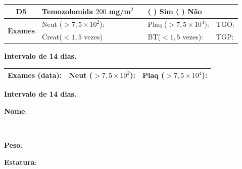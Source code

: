 \documentclass[11pt,a4paper,oldfontcommands]{memoir}
\def\entrywithlabel[#1]#2{\parbox{#1}{{\small #2:} \hrulefill}}
\begin{document}
\begin{center}
\begin{table}[H]
\begin{tabular}{p{1cm}p{5cm}|p{1cm}|p{4.5cm}|p{2cm}}
    \multicolumn{1}{c|}{\multirow{1}{*}{\textbf{D5}}}&{Temozolomida \(200\) mg/m\(^2\)}&&{(  ) Sim (  ) Não}&\\
    \hline
    \multicolumn{1}{c|}{\multirow{2}{*}{\textbf{Exames}}}&\multicolumn{2}{l|}{Neut (\(>7,5\times10^2\)):}&{Plaq (\(>7,5\times10^4\)):}&{TGO:}\\
    \cline{2-5}
    \multicolumn{1}{c|}{\multirow{2}{*}{{}}}&\multicolumn{2}{l|}{Creat(\(<1,5\) vezes)}&{BT(\(<1,5\) vezes):}&{TGP:}
    \\
    \hline
\end{tabular}
\end{table}
\textbf{Intervalo de 14 dias.}
\begin{table}[H]
\begin{tabular}{p{5cm}|p{5cm}|p{4.7cm}}
    \hline
    \textbf{Exames (data):}&{Neut (\(>7,5\times10^2\)):}&{Plaq (\(>7,5\times10^4\)):}
    \\
    \hline
\end{tabular}
\end{table}
\textbf{Intervalo de 14 dias.}

\pagebreak
    \noindent
\entrywithlabel[1\hsize]{\textbf{Nome}}\hfill
\\[0.3cm]
\entrywithlabel[.45\hsize]{\textbf{Peso}}\hfill  \entrywithlabel[.45\hsize]{\textbf{Estatura}}


\end{center}
\end{document}
